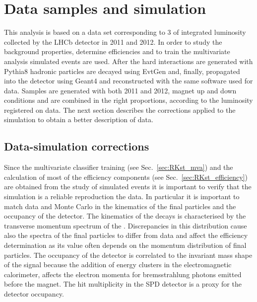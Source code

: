 \section{Data samples and simulation}

This analysis is based on a data set corresponding to 3 \invfb of integrated
luminosity collected by the LHCb detector in 2011 and 2012.
In order to study the background properties, determine efficiencies and to train the multivariate analysis
simulated events are used. After the hard interactions are generated with Pythia8 hadronic particles
are decayed using EvtGen and, finally, propagated into the detector using Geant4 and reconstructed
with the same software used for data. Samples are generated with both 2011 and 2012, magnet up and down
 conditions and are combined in the right proportions, according to the luminosity registered on data.
The next section describes the corrections applied to the simulation to obtain a better description of data.


\subsection{Data-simulation corrections}
\label{sec:RKst_mc_weighting}

Since the multivariate classifier training (see Sec.~\ref{sec:RKst_mva}) and the calculation
of most of the efficiency components (see Sec.~\ref{sec:RKst_efficiency}) are obtained from
the study of simulated events it is important to verify that the simulation is a reliable
reproduction the data. In particular it is important to match data and Monte Carlo
in the kinematics of the final particles and the occupancy of the detector.
The kinematics of the decays is characterised by the transverse momentum spectrum of
the \Bz. Discrepancies in this distribution cause also the spectra of the final particles
to differ from data and affect the efficiency determination as its value often
depends on the momentum distribution of final particles.
The occupancy of the detector is correlated to the invariant mass shape of the signal because
the addition of energy clusters in the electromagnetic calorimeter,
affects the electron momenta for bremsstrahlung photons emitted before the magnet.
The hit multiplicity in the SPD detector is a proxy for the detector occupancy.

